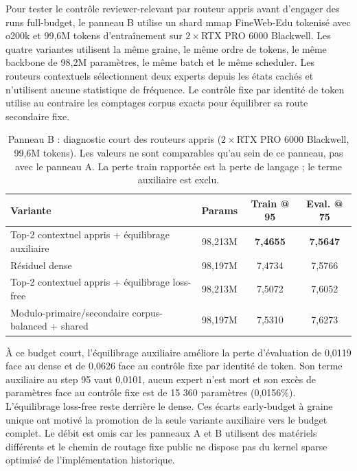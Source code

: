 \documentclass[10pt]{article}
\theoremstyle{definition}
\theoremstyle{remark}
\begin{document}
Pour tester le contr\^{o}le reviewer-relevant par routeur appris avant d'engager des runs full-budget, le panneau B utilise un shard mmap FineWeb-Edu tokenis\'{e} avec o200k et 99,6M tokens d'entra\^{i}nement sur $2\times$RTX PRO 6000 Blackwell. Les quatre variantes utilisent la m\^{e}me graine, le m\^{e}me ordre de tokens, le m\^{e}me backbone de 98,2M param\`{e}tres, le m\^{e}me batch et le m\^{e}me scheduler. Les routeurs contextuels s\'{e}lectionnent deux experts depuis les \'{e}tats cach\'{e}s et n'utilisent aucune statistique de fr\'{e}quence. Le contr\^{o}le fixe par identit\'{e} de token utilise au contraire les comptages corpus exacts pour \'{e}quilibrer sa route secondaire fixe.

\begin{table}[H]
\centering
\small
\caption{Panneau B : diagnostic court des routeurs appris ($2\times$RTX PRO 6000 Blackwell, 99,6M tokens). Les valeurs ne sont comparables qu'au sein de ce panneau, pas avec le panneau A. La perte train rapport\'{e}e est la perte de langage ; le terme auxiliaire est exclu.}
\label{tab:100m_router_short}
\begin{tabular}{lccc}
\toprule
\textbf{Variante} & \textbf{Params} & \textbf{Train @ 95} & \textbf{Eval. @ 75} \\
\midrule
Top-2 contextuel appris + \'{e}quilibrage auxiliaire & 98,213M & \textbf{7,4655} & \textbf{7,5647} \\
R\'{e}siduel dense & 98,197M & 7,4734 & 7,5766 \\
Top-2 contextuel appris + \'{e}quilibrage loss-free & 98,213M & 7,5072 & 7,6052 \\
Modulo-primaire/secondaire corpus-balanced + shared & 98,197M & 7,5310 & 7,6273 \\
\bottomrule
\end{tabular}
\end{table}

\`{A} ce budget court, l'\'{e}quilibrage auxiliaire am\'{e}liore la perte d'\'{e}valuation de 0,0119 face au dense et de 0,0626 face au contr\^{o}le fixe par identit\'{e} de token. Son terme auxiliaire au step 95 vaut 0,0101, aucun expert n'est mort et son exc\`{e}s de param\`{e}tres face au contr\^{o}le fixe est de 15 360 param\`{e}tres (0,0156\%). L'\'{e}quilibrage loss-free reste derri\`{e}re le dense. Ces \'{e}carts early-budget \`{a} graine unique ont motiv\'{e} la promotion de la seule variante auxiliaire vers le budget complet. Le d\'{e}bit est omis car les panneaux A et B utilisent des mat\'{e}riels diff\'{e}rents et le chemin de routage fixe public ne dispose pas du kernel sparse optimis\'{e} de l'impl\'{e}mentation historique.
\end{document}
